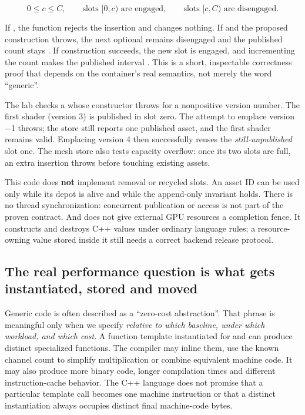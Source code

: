 \[
0\le c\le C,\qquad
\text{slots }[0,c)\text{ are engaged},\qquad
\text{slots }[c,C)\text{ are disengaged}.
\]

If , the function rejects the insertion and changes nothing. If  and the proposed construction throws, the next optional remains disengaged and the published count stays . If construction succeeds, the new slot is engaged, and incrementing the count makes the published interval \BookInlineCode{{[}0,c+1)}. This is a short, inspectable correctness proof that depends on the container's real semantics, not merely the word ``generic''.

The lab checks a  whose constructor throws for a nonpositive version number. The first shader (version 3) is published in slot zero. The attempt to emplace version −1 throws; the store still reports one published asset, and the first shader remains valid. Emplacing version 4 then successfully reuses the \emph{still-unpublished} slot one. The mesh store also tests capacity overflow: once its two slots are full, an extra insertion throws before touching existing assets.

This code does \textbf{not} implement removal or recycled slots. An asset ID can be used only while its depot is alive and while the append-only invariant holds. There is no thread synchronization: concurrent publication or access is not part of the proven contract. And  does not give external GPU resources a completion fence. It constructs and destroys C++ values under ordinary language rules; a resource-owning value stored inside it still needs a correct backend release protocol.

\subsection{The real performance question is what gets instantiated, stored and moved}\label{01-foundations-i-ch005-the-real-performance-question-is-what-gets-instantiated-stored-and-moved}

\hypertarget{01-foundations-i-ch005-the-real-performance-question-is-what-gets-instantiated-stored-and-moved}{}

Generic code is often described as a ``zero-cost abstraction''. That phrase is meaningful only when we specify \emph{relative to which baseline, under which workload, and which cost}. A function template instantiated for  and  can produce distinct specialized functions. The compiler may inline them, use the known channel count to simplify multiplication or combine equivalent machine code. It may also produce more binary code, longer compilation times and different instruction-cache behavior. The C++ language does not promise that a particular template call becomes one machine instruction or that a distinct instantiation always occupies distinct final machine-code bytes.

